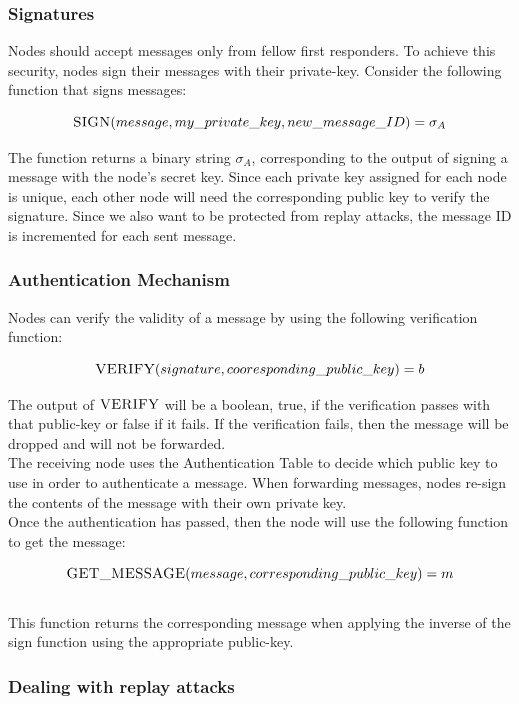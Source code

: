 \documentclass[letterpaper]{article}
\begin{document}
\subsubsection{Signatures}

Nodes should accept messages only from fellow first responders. 
To achieve this security, nodes sign their messages with their private-key. 
Consider the following function that signs messages:

$$\textsc{SIGN}(message, my\_private\_key, new\_message\_ID) = \sigma_{A}$$

\noindent The function returns a binary string $\sigma_{A}$, corresponding to the output of signing a message with the node's secret key. Since each private key assigned for each node is unique, each other node will need the corresponding public key to verify the signature. Since we also want to be protected from replay attacks, the message ID is incremented for each sent message.

\subsubsection{Authentication Mechanism}
Nodes can verify the validity of a message by using the following verification function:

$$\textsc{VERIFY}(signature, cooresponding\_public\_key) =  b $$

\noindent The output of $\textsc{VERIFY}$ will be a boolean, true, if the verification passes with that public-key or false if it fails. 
If the verification fails, then the message will be dropped and will not be forwarded.
\\
\noindent The receiving node uses the Authentication Table to decide which public key to use in order to authenticate a message.
When forwarding messages, nodes re-sign the contents of the message with their own private key.
\\

\noindent Once the authentication has passed, then the node will use the following function to get the message:

$$\textsc{GET\_MESSAGE}(message, corresponding\_public\_key) = m$$
\\

\noindent This function returns the corresponding message when applying the inverse of the sign function using the appropriate public-key.

\subsubsection{Dealing with replay attacks}
\end{document}
